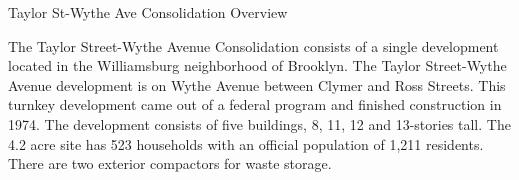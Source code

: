 Taylor St-Wythe Ave Consolidation Overview

The Taylor Street-Wythe Avenue Consolidation consists of a single development located in the Williamsburg neighborhood of Brooklyn. The Taylor Street-Wythe Avenue development is on Wythe Avenue between Clymer and Ross Streets. This turnkey development came out of a federal program and finished construction in 1974. The development consists of five buildings, 8, 11, 12 and 13-stories tall. The 4.2 acre site has 523 households with an official population of 1,211 residents. There are two exterior compactors for waste storage.
